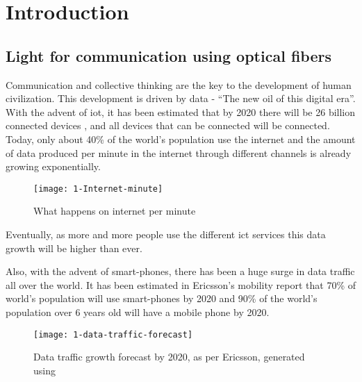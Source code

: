 \documentclass[../report.tex]{subfiles}
\begin{document}
	

	
\chapter{Introduction} 
	\section{Light for communication using optical fibers}
Communication and collective thinking are the key to the development of human civilization. This development is driven by data - “The new oil of this digital era”. With the advent of \gls{iot}, it has been estimated that by 2020 there will be 26 billion connected devices \cite{gartner_iot}, and all devices that can be connected will be connected. Today, only about 40\% \cite{internet_users} of the world’s population use the internet and the amount of data produced per minute in the internet through different channels is already growing exponentially. 

\begin{figure}[h]
	\centering
	\texttt{[image: 1-Internet-minute]}
	\caption{What happens on internet per minute \cite{internet_minute}}
	\label{fig:1_internet_minute}
\end{figure}
\noindent Eventually, as more and more people use the different \gls{ict} services this data growth will be higher than ever.\par

Also, with the advent of smart-phones, there has been a huge surge in data traffic all over the world. It has been estimated in Ericsson's mobility report \cite{ericsson_mobility_report} that 70\% of world's population will use smart-phones by 2020 and 90\% of the world's population over 6 years old will have a mobile phone by 2020. 
\begin{figure}[!tbp]
	\centering
	\texttt{[image: 1-data-traffic-forecast]}
	\caption{Data traffic growth forecast by 2020, as per Ericsson, generated using \cite{ericsson_traffic_exploration} \cite{internet_minute}}
	\label{fig:1_data_traffic_forecast}
\end{figure}
\end{document}
